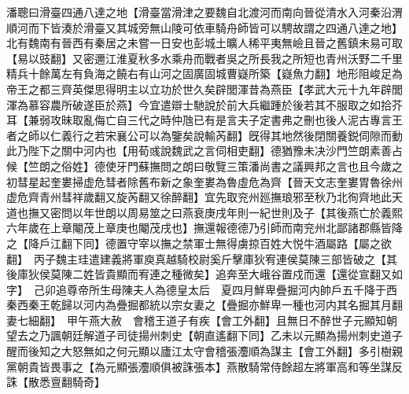 潘聰曰滑臺四通八達之地【滑臺當滑津之要魏自北渡河而南向晉從清水入河秦沿渭順河而下皆湊於滑臺又其城旁無山陵可依車騎舟師皆可以騁故謂之四通八達之地】北有魏南有晉西有秦居之未嘗一日安也彭城土曠人稀平夷無嶮且晉之舊鎮未易可取【易以豉翻】又密邇江淮夏秋多水乘舟而戰者吳之所長我之所短也青州沃野二千里精兵十餘萬左有負海之饒右有山河之固廣固城曹嶷所築【嶷魚力翻】地形阻峻足為帝王之都三齊英傑思得明主以立功於世久矣辟閭渾昔為燕臣【孝武大元十九年辟閭渾為慕容農所破遂臣於燕】今宜遣辯士馳說於前大兵繼踵於後若其不服取之如拾芥耳【兼弱攻昧取亂侮亡自三代之時仲虺已有是言夫子定書弗之刪也後人泥古專言王者之師以仁義行之若宋襄公可以為鑒矣說輸芮翻】旣得其地然後閉關養鋭伺隙而動此乃陛下之關中河内也【用荀彧說魏武之言伺相吏翻】德猶豫未决沙門竺朗素善占候【竺朗之俗姓】德使牙門蘇撫問之朗曰敬覽三策潘尚書之議興邦之言也且今歲之初彗星起奎婁掃虚危彗者除舊布新之象奎婁為魯虛危為齊【晉天文志奎婁胃魯徐州虚危齊青州彗祥歲翻又旋芮翻又徐醉翻】宜先取兖州廵撫琅邪至秋乃北徇齊地此天道也撫又密問以年世朗以周易筮之曰燕衰庚戌年則一紀世則及子【其後燕亡於義熙六年歲在上章閹茂上章庚也閹茂戌也】撫還報德德乃引師而南兖州北鄙諸郡縣皆降之【降戶江翻下同】德置守宰以撫之禁軍士無得虜掠百姓大悦牛酒屬路【屬之欲翻】　丙子魏主珪遣建義將軍庾真越騎校尉奚斤擊庫狄宥連侯莫陳三部皆破之【其後庫狄侯莫陳二姓皆貴顯而宥連之種微矣】追奔至大峨谷置戍而還【還從宣翻又如字】　己卯追尊帝所生母陳夫人為德皇太后　夏四月鮮卑疊掘河内帥戶五千降于西秦西秦王乾歸以河内為疊掘都統以宗女妻之【疊掘亦鮮卑一種也河内其名掘其月翻妻七細翻】　甲午燕大赦　會稽王道子有疾【會工外翻】且無日不醉世子元顯知朝望去之乃諷朝廷解道子司徒揚州刺史【朝直遙翻下同】乙未以元顯為揚州刺史道子醒而後知之大怒無如之何元顯以廬江太守會稽張灋順為謀主【會工外翻】多引樹親黨朝貴皆畏事之【為元顯張灋順俱被誅張本】燕散騎常侍餘超左將軍高和等坐謀反誅【散悉亶翻騎奇】

